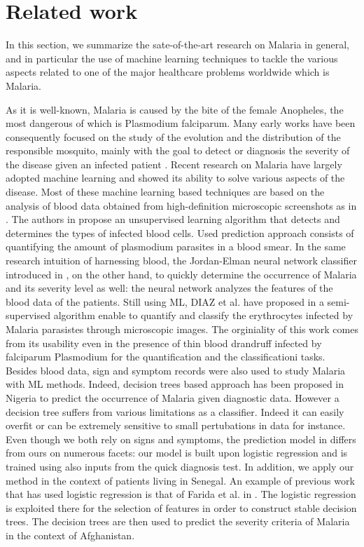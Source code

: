 \section{Related work}\label{related_work}
In this section, we summarize the sate-of-the-art research on Malaria in general, and in particular the
use of machine learning techniques to tackle the various aspects related to one of the 
major healthcare problems worldwide which is Malaria.

As it is well-known, Malaria is caused by the bite of the female Anopheles, the most dangerous of which
is Plasmodium falciparum. Many early works have been consequently focused on the study of the evolution and
the distribution of the responsible mosquito, mainly with the goal to detect or diagnosis the severity of the 
disease given an infected patient \cite{Fe03,Al09}. Recent research on Malaria have largely adopted machine learning
and showed its ability to solve various aspects of the disease. Most of these machine learning based techniques are 
based on the analysis of blood data obtained from high-definition microscopic screenshots as in \cite{Ku18}. The authors
in \cite{Ku18} propose an unsupervised learning algorithm that detects and determines the types of infected blood cells.
Used prediction approach consists of quantifying the amount of plasmodium parasites in a blood smear. In the same research intuition
of harnessing blood, the Jordan-Elman neural network classifier introduced in \cite{Ha15}, on the other hand, to quickly determine the occurrence 
of Malaria and its severity level as well: the neural network analyzes the features of the blood data of the patients.  
Still using ML, DIAZ et al. have proposed in \cite{Dia09} a semi-supervised algorithm enable to quantify and classify the 
erythrocytes infected by Malaria parasistes through microscopic images. The orginiality of this work comes from its usability
even in the presence of thin blood drandruff infected by falciparum Plasmodium for the quantification and the classificationi tasks.
Besides blood data, sign and symptom records were also used to study Malaria with ML methods. Indeed, decision trees based approach
has been proposed in Nigeria \cite{Ug10} to predict the occurrence of Malaria given diagnostic data. However a decision tree suffers 
from various limitations as a classifier. Indeed it can easily overfit or can be extremely sensitive to small pertubations in data for instance.
Even though we both rely on signs and symptoms, the prediction model in \cite{Ug10} differs from ours on numerous facets: our model is built upon
logistic regression and is trained using also inputs from the quick diagnosis test. In addition, we apply our method in the context of patients living in Senegal. 
An example of previous work that has used logistic regression is that of Farida et al. in \cite{Ad10}. The logistic regression is exploited
there for the selection of features in order to construct stable decision trees. The decision trees are then used to predict the severity
criteria of Malaria in the context of Afghanistan. 


